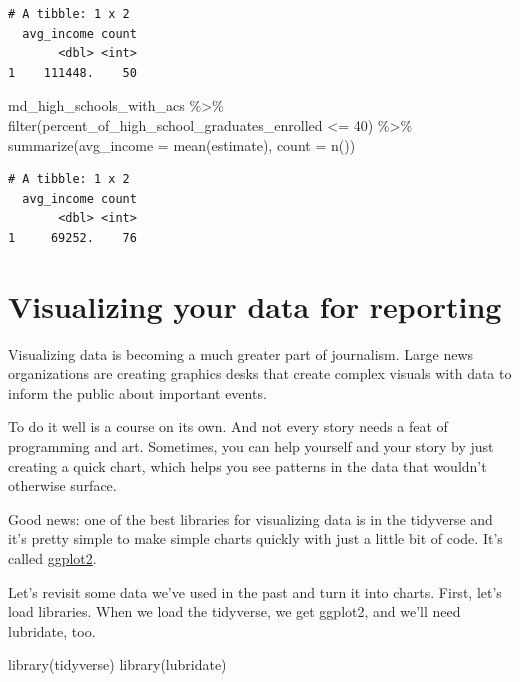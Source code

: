 \documentclass[
  letterpaper,
  DIV=11,
  numbers=noendperiod]{scrreprt}
\newenvironment{Shaded}{\begin{snugshade}}{\end{snugshade}}
\newcommand{\AttributeTok}[1]{\textcolor[rgb]{0.40,0.45,0.13}{#1}}
\newcommand{\DecValTok}[1]{\textcolor[rgb]{0.68,0.00,0.00}{#1}}
\newcommand{\FunctionTok}[1]{\textcolor[rgb]{0.28,0.35,0.67}{#1}}
\newcommand{\NormalTok}[1]{\textcolor[rgb]{0.00,0.23,0.31}{#1}}
\newcommand{\SpecialCharTok}[1]{\textcolor[rgb]{0.37,0.37,0.37}{#1}}
\begin{document}
\begin{verbatim}
# A tibble: 1 x 2
  avg_income count
       <dbl> <int>
1    111448.    50
\end{verbatim}

\begin{Shaded}
\begin{Highlighting}[]
\NormalTok{md\_high\_schools\_with\_acs }\SpecialCharTok{\%\textgreater{}\%}
  \FunctionTok{filter}\NormalTok{(percent\_of\_high\_school\_graduates\_enrolled }\SpecialCharTok{\textless{}=} \DecValTok{40}\NormalTok{) }\SpecialCharTok{\%\textgreater{}\%} 
  \FunctionTok{summarize}\NormalTok{(}\AttributeTok{avg\_income =} \FunctionTok{mean}\NormalTok{(estimate), }\AttributeTok{count =} \FunctionTok{n}\NormalTok{())}
\end{Highlighting}
\end{Shaded}

\begin{verbatim}
# A tibble: 1 x 2
  avg_income count
       <dbl> <int>
1     69252.    76
\end{verbatim}


\hypertarget{visualizing-your-data-for-reporting}{%
\chapter{Visualizing your data for
reporting}\label{visualizing-your-data-for-reporting}}

Visualizing data is becoming a much greater part of journalism. Large
news organizations are creating graphics desks that create complex
visuals with data to inform the public about important events.

To do it well is a course on its own. And not every story needs a feat
of programming and art. Sometimes, you can help yourself and your story
by just creating a quick chart, which helps you see patterns in the data
that wouldn't otherwise surface.

Good news: one of the best libraries for visualizing data is in the
tidyverse and it's pretty simple to make simple charts quickly with just
a little bit of code. It's called
\href{https://ggplot2.tidyverse.org/}{ggplot2}.

Let's revisit some data we've used in the past and turn it into charts.
First, let's load libraries. When we load the tidyverse, we get ggplot2,
and we'll need lubridate, too.

\begin{Shaded}
\begin{Highlighting}[]
\FunctionTok{library}\NormalTok{(tidyverse)}
\FunctionTok{library}\NormalTok{(lubridate)}
\end{Highlighting}
\end{Shaded}
\end{document}
